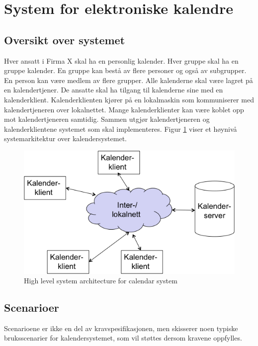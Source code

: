 \section{System for elektroniske kalendre}
\subsection{Oversikt over systemet}

Hver ansatt i Firma X skal ha en personlig kalender. Hver gruppe skal ha en gruppe kalender. En gruppe kan bestå av flere personer og også av subgrupper. En person kan være medlem av flere grupper. Alle kalenderne skal være lagret på en kalendertjener. De ansatte skal ha tilgang til kalenderne sine med en kalenderklient. Kalenderklienten kjører på en lokalmaskin som kommuniserer med kalendertjeneren over lokalnettet. Mange kalenderklienter kan være koblet opp mot kalendertjeneren samtidig. Sammen utgjør kalendertjeneren og kalenderklientene systemet som skal implementeres.
Figur \ref{fig:high-level-architecture}  viser et høynivå systemarkitektur over kalendersystemet.

\begin{figure}[H]
    \centering
    \includegraphics[scale=0.5]{resources/high-level-architecture.png}
    \caption{High level system architecture for calendar system}
    \label{fig:high-level-architecture}
\end{figure}

\subsection{Scenarioer}

Scenarioene er ikke en del av kravspesifikasjonen, men skisserer noen typiske bruksscenarier for kalendersystemet, som vil støttes dersom kravene oppfylles.

